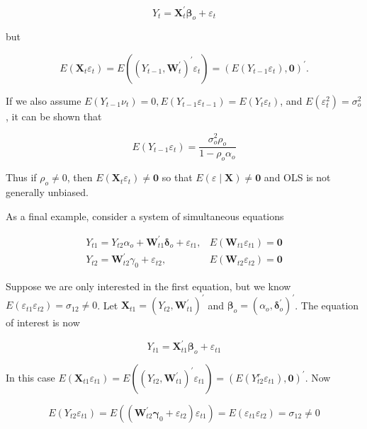 \documentclass[10pt]{article}
\begin{document}
$$
Y_{t}=\mathbf{X}_{t}^{\prime} \boldsymbol{\beta}_{o}+\varepsilon_{t}
$$

but

$$
E\left(\mathbf{X}_{t} \varepsilon_{t}\right)=E\left(\left(Y_{t-1}, \mathbf{W}_{t}^{\prime}\right)^{\prime} \varepsilon_{t}\right)=\left(E\left(Y_{t-1} \varepsilon_{t}\right), \mathbf{0}\right)^{\prime} .
$$

If we also assume $E\left(Y_{t-1} \nu_{t}\right)=0, E\left(Y_{t-1} \varepsilon_{t-1}\right)=E\left(Y_{t} \varepsilon_{t}\right)$, and $E\left(\varepsilon_{t}^{2}\right)=\sigma_{o}^{2}$, it can be shown that

$$
E\left(Y_{t-1} \varepsilon_{t}\right)=\frac{\sigma_{o}^{2} \rho_{o}}{1-\rho_{o} \alpha_{o}}
$$

Thus if $\rho_{o} \neq 0$, then $E\left(\mathbf{X}_{t} \varepsilon_{t}\right) \neq \mathbf{0}$ so that $E(\varepsilon \mid \mathbf{X}) \neq \mathbf{0}$ and OLS is not generally unbiased.

As a final example, consider a system of simultaneous equations

$$
\begin{array}{rlr}
Y_{t 1}=Y_{t 2} \alpha_{o}+\mathbf{W}_{t 1}^{\prime} \boldsymbol{\delta}_{o}+\varepsilon_{t 1}, & E\left(\mathbf{W}_{t 1} \varepsilon_{t 1}\right)=\mathbf{0} \\
Y_{t 2}=\mathbf{W}_{t 2}^{\prime} \gamma_{0}+\varepsilon_{t 2}, & E\left(\mathbf{W}_{t 2} \varepsilon_{t 2}\right)=\mathbf{0}
\end{array}
$$

Suppose we are only interested in the first equation, but we know $E\left(\varepsilon_{t 1} \varepsilon_{t 2}\right) =\sigma_{12} \neq 0$. Let $\mathbf{X}_{t 1}=\left(Y_{t 2}, \mathbf{W}_{t 1}^{\prime}\right)^{\prime}$ and $\boldsymbol{\beta}_{o}=\left(\alpha_{o}, \boldsymbol{\delta}_{o}^{\prime}\right)^{\prime}$. The equation of interest is now

$$
Y_{t 1}=\mathbf{X}_{t 1}^{\prime} \boldsymbol{\beta}_{o}+\varepsilon_{t 1}
$$

In this case $E\left(\mathbf{X}_{t 1} \varepsilon_{t 1}\right)=E\left(\left(Y_{t 2}, \mathbf{W}_{t 1}^{\prime}\right)^{\prime} \varepsilon_{t 1}\right)=\left(E\left(Y_{t 2}^{r} \varepsilon_{t 1}\right), \mathbf{0}\right)^{\prime}$. Now

$$
E\left(Y_{t 2} \varepsilon_{t 1}\right)=E\left(\left(\mathbf{W}_{t 2}^{\prime} \boldsymbol{\gamma}_{0}+\varepsilon_{t 2}\right) \varepsilon_{t 1}\right)=E\left(\varepsilon_{t 1} \varepsilon_{t 2}\right)=\sigma_{12} \neq 0
$$
\end{document}
